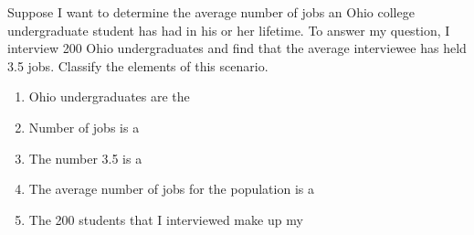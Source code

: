 \documentclass{ximera}
\begin{document}
\begin{problem}\label{prob:140hom1prob5}
Suppose I want to determine the average number of jobs an Ohio college undergraduate student has had in his or her lifetime.  To answer my question, I interview 200 Ohio undergraduates and find that the average interviewee has held 3.5 jobs.  Classify the elements of this scenario.
\begin{enumerate}
\item Ohio undergraduates are the
\begin{multipleChoice}  
\end{multipleChoice}

\item Number of jobs is a
\begin{multipleChoice}  
\end{multipleChoice}

\item The number 3.5 is a
    \begin{multipleChoice}  
\end{multipleChoice}

\item The average number of jobs for the population is a
\begin{multipleChoice}  
\end{multipleChoice}

\item The 200 students that I interviewed make up my
\begin{multipleChoice}  
\end{multipleChoice}

\end{enumerate}
\end{problem}
\end{document}
